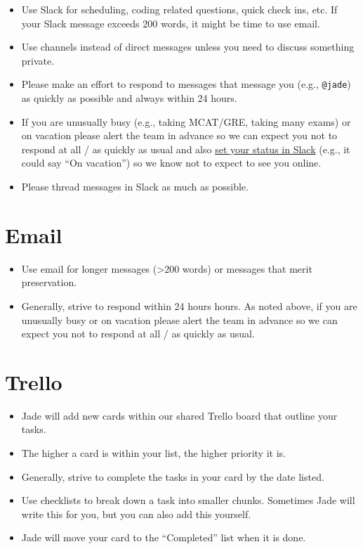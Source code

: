 \documentclass[
]{book}
\providecommand{\tightlist}{%
  \setlength{\itemsep}{0pt}\setlength{\parskip}{0pt}}
\begin{document}
\begin{itemize}
\tightlist
\item
  Use Slack for scheduling, coding related questions, quick check ins, etc. If your Slack message exceeds 200 words, it might be time to use email.
\item
  Use channels instead of direct messages unless you need to discuss something private.
\item
  Please make an effort to respond to messages that message you (e.g., \texttt{@jade}) as quickly as possible and always within 24 hours.
\item
  If you are unusually busy (e.g., taking MCAT/GRE, taking many exams) or on vacation please alert the team in advance so we can expect you not to respond at all / as quickly as usual and also \href{https://get.slack.help/hc/en-us/articles/201864558-Set-your-Slack-status-and-availability}{set your status in Slack} (e.g., it could say ``On vacation'') so we know not to expect to see you online.
\item
  Please thread messages in Slack as much as possible.
\end{itemize}

\section{Email}\label{email}

\begin{itemize}
\tightlist
\item
  Use email for longer messages (\textgreater200 words) or messages that merit preservation.
\item
  Generally, strive to respond within 24 hours hours. As noted above, if you are unusually busy or on vacation please alert the team in advance so we can expect you not to respond at all / as quickly as usual.
\end{itemize}

\section{Trello}\label{trello}

\begin{itemize}
\tightlist
\item
  Jade will add new cards within our shared Trello board that outline your tasks.
\item
  The higher a card is within your list, the higher priority it is.
\item
  Generally, strive to complete the tasks in your card by the date listed.
\item
  Use checklists to break down a task into smaller chunks. Sometimes Jade will write this for you, but you can also add this yourself.
\item
  Jade will move your card to the ``Completed'' list when it is done.
\end{itemize}
\end{document}
